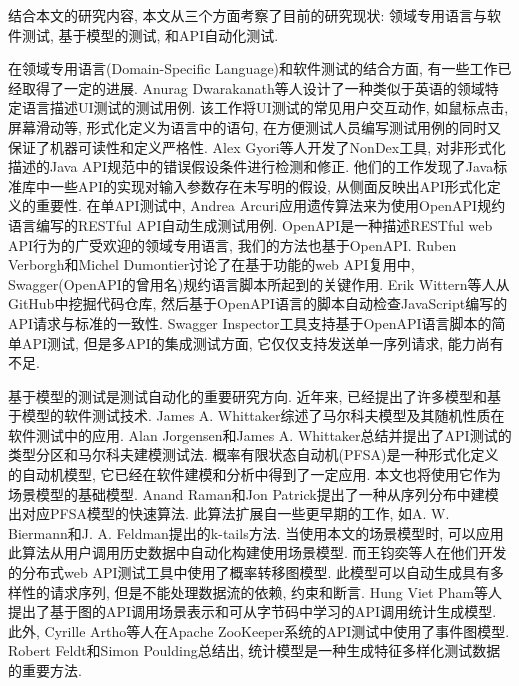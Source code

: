     	结合本文的研究内容, 本文从三个方面考察了目前的研究现状: 领域专用语言与软件测试, 基于模型的测试, 和API自动化测试.
    	
    	在领域专用语言(Domain-Specific Language)和软件测试的结合方面, 有一些工作已经取得了一定的进展. Anurag Dwarakanath等人\cite{dwarakanatha17}设计了一种类似于英语的领域特定语言描述UI测试的测试用例. 该工作将UI测试的常见用户交互动作, 如鼠标点击, 屏幕滑动等, 形式化定义为语言中的语句, 在方便测试人员编写测试用例的同时又保证了机器可读性和定义严格性. Alex Gyori等人\cite{gyoria16}开发了NonDex工具, 对非形式化描述的Java API规范中的错误假设条件进行检测和修正. 他们的工作发现了Java标准库中一些API的实现对输入参数存在未写明的假设, 从侧面反映出API形式化定义的重要性. 在单API测试中, Andrea Arcuri\cite{andreaa17}应用遗传算法来为使用OpenAPI规约语言编写的RESTful API自动生成测试用例. OpenAPI\cite{openapi17}是一种描述RESTful web API行为的广受欢迎的领域专用语言, 我们的方法也基于OpenAPI. Ruben Verborgh和Michel Dumontier\cite{verborgh2016web}讨论了在基于功能的web API复用中, Swagger(OpenAPI的曾用名)规约语言脚本所起到的关键作用. Erik Wittern等人\cite{wittern2017statically}从GitHub中挖掘代码仓库, 然后基于OpenAPI语言的脚本自动检查JavaScript编写的API请求与标准的一致性. Swagger Inspector\cite{swaggerinspetor17}工具支持基于OpenAPI语言脚本的简单API测试, 但是多API的集成测试方面, 它仅仅支持发送单一序列请求, 能力尚有不足.
    	
    	基于模型的测试是测试自动化的重要研究方向. 近年来, 已经提出了许多模型和基于模型的软件测试技术. James A. Whittaker\cite{Whittaker1997}综述了马尔科夫模型及其随机性质在软件测试中的应用. Alan Jorgensen和James A. Whittaker\cite{jorgensen2000api}总结并提出了API测试的类型分区和马尔科夫建模测试法. 概率有限状态自动机(PFSA)\cite{enriquev05}是一种形式化定义的自动机模型, 它已经在软件建模和分析中得到了一定应用. 本文也将使用它作为场景模型的基础模型. Anand Raman和Jon Patrick\cite{anand97}提出了一种从序列分布中建模出对应PFSA模型的快速算法. 此算法扩展自一些更早期的工作, 如A. W. Biermann和J. A. Feldman提出的k-tails方法\cite{abiermann72}. 当使用本文的场景模型时, 可以应用此算法从用户调用历史数据中自动化构建使用场景模型. 而王钧奕等人\cite{junyiw17}在他们开发的分布式web API测试工具中使用了概率转移图模型. 此模型可以自动生成具有多样性的请求序列, 但是不能处理数据流的依赖, 约束和断言. Hung Viet Pham等人\cite{pham2016learning}提出了基于图的API调用场景表示和可从字节码中学习的API调用统计生成模型. 此外, Cyrille Artho等人\cite{cyrille17}在Apache ZooKeeper系统的API测试中使用了事件图模型. Robert Feldt和Simon Poulding\cite{feldt2017searching}总结出, 统计模型是一种生成特征多样化测试数据的重要方法.
    	
